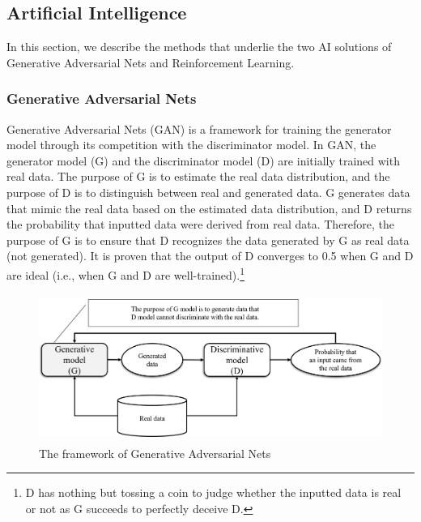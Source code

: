\documentclass{article}
\begin{document}
\subsection{Artificial Intelligence}
In this section, we describe the methods that underlie the two AI solutions of Generative Adversarial Nets and Reinforcement Learning.

\subsubsection{Generative Adversarial Nets}
Generative Adversarial Nets (GAN) is a framework for training the generator model through its competition with the discriminator model. In GAN, the generator model (G) and the discriminator model (D) are initially trained with real data. The purpose of G is to estimate the real data distribution, and the purpose of D is to distinguish between real and generated data. G generates data that mimic the real data based on the estimated data distribution, and D returns the probability that inputted data were derived from real data. Therefore, the purpose of G is to ensure that D recognizes the data generated by G as real data (not generated). It is proven that the output of D converges to 0.5 when G and D are ideal (i.e., when G and D are well-trained)\cite{goodfellow2014generative}.\footnote{D has nothing but tossing a coin to judge whether the inputted data is real or not as G succeeds to perfectly deceive D.}

\begin{figure}[ht]
    \centering
    \includegraphics[width = 12cm, height = 4.81cm]{images/GAN_framework.png}
    \caption{The framework of Generative Adversarial Nets}
    \label{fig:GAN_Framework}
\end{figure} 
\end{document}
